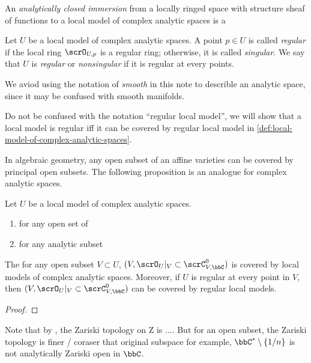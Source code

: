 \begin{definition}
	An \emph{analytically closed immersion} from a locally ringed space with structure sheaf of functions to a local model of complex analytic spaces is a \Yang{}
\end{definition}

\begin{definition}\label{def:regular-and-singular-points-on-local-models}
	Let $U$ be a local model of complex analytic spaces.
	A point $p \in U$ is called \emph{regular} if the local ring $\scrO_{U,p}$ is a regular ring;
	otherwise, it is called \emph{singular}.
	We say that $U$ is \emph{regular} or \emph{nonsingular} if it is regular at every points.
\end{definition}
\begin{remark}
	We aviod using the notation of \emph{smooth} in this note to describle an analytic space, since it may be confused with smooth manifolds.
	\Yang{}
\end{remark}
\begin{remark}
	Do not be confused with the notation ``regular local model'', we will show that a local model is regular iff it can be covered by regular local model in \cref{def:local-model-of-complex-analytic-spaces}.
	\Yang{}
\end{remark}

In algebraic geometry, any open subset of an affine varieties can be covered by principal open subsets.
The following proposition is an analogue for complex analytic spaces.


\begin{proposition}
	Let $U$ be a local model of complex analytic spaces.
	\begin{enumerate}
		\item for any open set of
		\item for any analytic subset
	\end{enumerate}
	The for any open subset $V \subset U$, $(V, \scrO_U|_V \subset \scrC_{V,\bbC}^0)$ is covered by local models of complex analytic spaces.
	Moreover, if $U$ is regular at every point in $V$, then $(V, \scrO_U|_V \subset \scrC_{V,\bbC}^0)$ can be covered by regular local models.
\end{proposition}
\begin{proof}
	\Yang{}
\end{proof}

\begin{remark}
	Note that by \Yang{}, the Zariski topology on Z is ....
	But for an open subset, the Zariski topology is finer / coraser that original subspace
	\Yang{}
	for example, $\bbC^*\setminus \{1/n\}$ is not analytically Zariski open in $\bbC$.
\end{remark}

